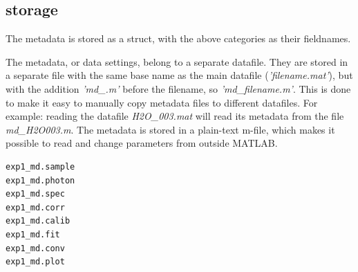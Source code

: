 \subsection {storage}
The metadata is stored as a struct, with the above categories as their fieldnames. 

The metadata, or data settings, belong to a separate datafile. They are stored in a separate file with the same base name as the main datafile (\emph{'filename.mat'}), but with the addition \emph{'md\_.m'} before the filename, so \emph{'md\_filename.m'}. This is done to make it easy to manually copy metadata files to different datafiles. For example: reading the datafile \emph{H2O\_003.mat} will read its metadata from the file \emph{md\_H2O003.m}. The metadata is stored in a plain-text m-file, which makes it possible to read and change parameters from outside MATLAB.

\lstset{language=MATLAB}
\begin{lstlisting}
exp1_md.sample
exp1_md.photon
exp1_md.spec
exp1_md.corr
exp1_md.calib
exp1_md.fit
exp1_md.conv
exp1_md.plot
\end{lstlisting}
